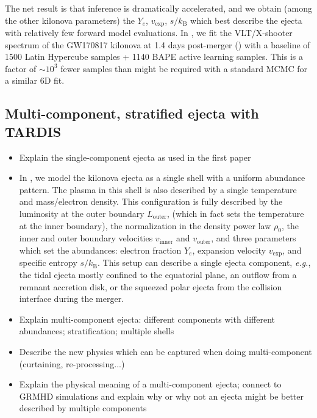 \documentclass[twocolumn, twocolappendix]{aastex63}
\def\eg{{\it e.g.}}
\begin{document}
The net result is that inference is dramatically accelerated, and we obtain (among the other kilonova parameters) the $Y_e$, $v_{\mathrm{exp}}$, $s / k_{\mathrm{B}}$ which best describe the ejecta with relatively few forward model evaluations. In \cite{vieira23}, we fit the VLT/X-shooter spectrum of the GW170817 kilonova at 1.4 days post-merger (\citealt{pian17, smartt17}) with a baseline of 1500 Latin Hypercube samples + 1140 BAPE active learning samples. This is a factor of $\sim 10^3$ fewer samples than might be required with a standard MCMC for a similar 6D fit.

\subsection{Multi-component, stratified ejecta with \textsc{TARDIS}}\label{ssc:multi-component-TARDIS}

\begin{itemize}

    \item Explain the single-component ejecta as used in the first paper

    \item In \cite{vieira23}, we model the kilonova ejecta as a single shell with a uniform abundance pattern. The plasma in this shell is also described by a single temperature and mass/electron density. This configuration is fully described by the luminosity at the outer boundary $L_{\mathrm{outer}}$, (which in fact sets the temperature at the inner boundary), the normalization in the density power law $\rho_0$, the inner and outer boundary velocities $v_{\mathrm{inner}}$ and $v_{\mathrm{outer}}$, and three parameters which set the abundances: electron fraction $Y_e$, expansion velocity $v_{\mathrm{exp}}$, and specific entropy $s / k_{\mathrm{B}}$. This setup can describe a single ejecta component, \eg, the tidal ejecta mostly confined to the equatorial plane, an outflow from a remnant accretion disk, or the squeezed polar ejecta from the collision interface during the merger. 

    \item Explain multi-component ejecta: different components with different abundances; stratification; multiple shells

    \item Describe the new physics which can be captured when doing multi-component (curtaining, re-processing...)

    \item Explain the physical meaning of a multi-component ejecta; connect to GRMHD simulations and explain why or why not an ejecta might be better described by multiple components

\end{itemize}
\end{document}
